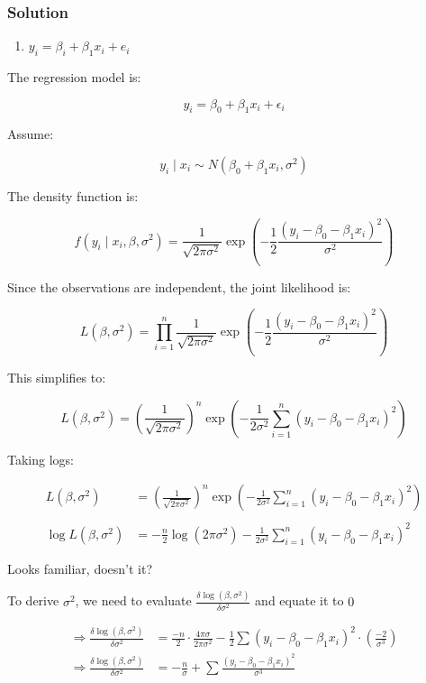 \documentclass[
]{article}
\providecommand{\tightlist}{%
  \setlength{\itemsep}{0pt}\setlength{\parskip}{0pt}}
\begin{document}
\subsubsection{Solution}\label{solution-3}

\begin{enumerate}
\def\labelenumi{\alph{enumi}.}
\tightlist
\item
  \(y_i = \beta_i + \beta_1x_i + e_i\)
\end{enumerate}

The regression model is:

\[
y_i = \beta_0 + \beta_1 x_i + \epsilon_i
\]

Assume:

\[
y_i \mid x_i \sim N(\beta_0 + \beta_1 x_i, \sigma^2)
\]

The density function is:

\[
f(y_i \mid x_i, \beta, \sigma^2)
=
\frac{1}{\sqrt{2\pi\sigma^2}}
\exp\left(
-\frac{1}{2}
\frac{(y_i - \beta_0 - \beta_1 x_i)^2}{\sigma^2}
\right)
\]

Since the observations are independent, the joint likelihood is:

\[
L(\beta,\sigma^2)
=
\prod_{i=1}^{n}
\frac{1}{\sqrt{2\pi\sigma^2}}
\exp\left(
-\frac{1}{2}
\frac{(y_i - \beta_0 - \beta_1 x_i)^2}{\sigma^2}
\right)
\]

This simplifies to:

\[
L(\beta,\sigma^2)
=
\left(\frac{1}{\sqrt{2\pi\sigma^2}}\right)^n
\exp\left(
-\frac{1}{2\sigma^2}
\sum_{i=1}^{n}
(y_i - \beta_0 - \beta_1 x_i)^2
\right)
\]

Taking logs:

\begin{align*}
  L(\beta,\sigma^2)
  &=
  \left(\frac{1}{\sqrt{2\pi\sigma^2}}\right)^n
  \exp\left(
  -\frac{1}{2\sigma^2}
  \sum_{i=1}^{n}
  (y_i - \beta_0 - \beta_1 x_i)^2
  \right) \\
  \\
  \log L(\beta,\sigma^2)
  &=
  -\frac{n}{2} \log(2\pi\sigma^2)
  -
  \frac{1}{2\sigma^2}
  \sum_{i=1}^{n}
  (y_i - \beta_0 - \beta_1 x_i)^2
\end{align*}

Looks familiar, doesn't it?

To derive \(\sigma^2\), we need to evaluate
\(\frac{\delta\log(\beta,\sigma^2)}{\delta\sigma^2}\) and equate it to
\(0\)

\begin{align*}
  \Rightarrow \frac{\delta\log(\beta,\sigma^2)}{\delta\sigma^2}
  & = \frac{-n}{2} \cdot \frac{4\pi\sigma}{2\pi\sigma^2} 
  -\frac{1}{2} \sum 
  (y_i - \beta_0 - \beta_1 x_i)^2 \cdot 
  \left(\frac{-2}{\sigma^3}
  \right) \\
  
  \Rightarrow \frac{\delta\log(\beta,\sigma^2)}{\delta\sigma^2}
  & =
  -\frac{n}{\sigma} + \sum \frac{(y_i - \beta_0 - \beta_1 x_i)^2 }{\sigma^3}
\end{align*}
\end{document}
